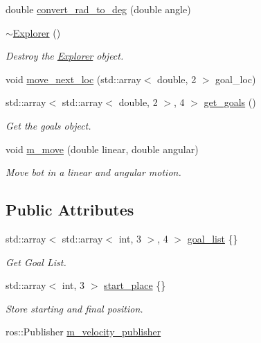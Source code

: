\begin{DoxyCompactItemize}
double \hyperlink{class_explorer_ac3a5c9368647dd9d2c36d12497bd889e}{convert\+\_\+rad\+\_\+to\+\_\+deg} (double angle)
\item 
\hyperlink{class_explorer_aa1b0a71e92e003e9162a5ba99d843392}{$\sim$\+Explorer} ()
\begin{DoxyCompactList}\small\item\em Destroy the \hyperlink{class_explorer}{Explorer} object. \end{DoxyCompactList}\item 
void \hyperlink{class_explorer_a2b0c1e46e1a17e99f4156edf5a93b691}{move\+\_\+next\+\_\+loc} (std\+::array$<$ double, 2 $>$ goal\+\_\+loc)
\item 
std\+::array$<$ std\+::array$<$ double, 2 $>$, 4 $>$ \hyperlink{class_explorer_a847e3ad2e7233d493a8dcfdd7139cb58}{get\+\_\+goals} ()
\begin{DoxyCompactList}\small\item\em Get the goals object. \end{DoxyCompactList}\item 
void \hyperlink{class_explorer_ace304ef65547f4a3ff6458d934c54e87}{m\+\_\+move} (double linear, double angular)
\begin{DoxyCompactList}\small\item\em Move bot in a linear and angular motion. \end{DoxyCompactList}\end{DoxyCompactItemize}
\subsection*{Public Attributes}
\begin{DoxyCompactItemize}
\item 
std\+::array$<$ std\+::array$<$ int, 3 $>$, 4 $>$ \hyperlink{class_explorer_acda1856f421dfe836f39de446415b969}{goal\+\_\+list} \{\}
\begin{DoxyCompactList}\small\item\em Get Goal List. \end{DoxyCompactList}\item 
std\+::array$<$ int, 3 $>$ \hyperlink{class_explorer_af1aee46522a58db39d3643f2138c76fa}{start\+\_\+place} \{\}
\begin{DoxyCompactList}\small\item\em Store starting and final position. \end{DoxyCompactList}\item 
ros\+::\+Publisher \hyperlink{class_explorer_aee857cd646f2ce6eb7e017a67e90bcdf}{m\+\_\+velocity\+\_\+publisher}
\end{DoxyCompactItemize}


